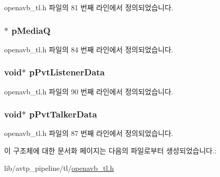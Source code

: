 openavb\+\_\+tl.\+h 파일의 81 번째 라인에서 정의되었습니다.

\subsubsection[{\texorpdfstring{p\+MediaQ}{pMediaQ}}]{$\ast$ p\+MediaQ}\hypertarget{structtl__state__t_a19b6a37a9e1222c5c08444ea175d6a45}{}\label{structtl__state__t_a19b6a37a9e1222c5c08444ea175d6a45}


openavb\+\_\+tl.\+h 파일의 84 번째 라인에서 정의되었습니다.

\subsubsection[{\texorpdfstring{p\+Pvt\+Listener\+Data}{pPvtListenerData}}]{\setlength{\rightskip}{0pt plus 5cm}void$\ast$ p\+Pvt\+Listener\+Data}\hypertarget{structtl__state__t_a37b77c3754bf67c9e13a356a2ea70ec6}{}\label{structtl__state__t_a37b77c3754bf67c9e13a356a2ea70ec6}


openavb\+\_\+tl.\+h 파일의 90 번째 라인에서 정의되었습니다.

\subsubsection[{\texorpdfstring{p\+Pvt\+Talker\+Data}{pPvtTalkerData}}]{\setlength{\rightskip}{0pt plus 5cm}void$\ast$ p\+Pvt\+Talker\+Data}\hypertarget{structtl__state__t_a18baa6360ea16357a2e906bc9bc4e61e}{}\label{structtl__state__t_a18baa6360ea16357a2e906bc9bc4e61e}


openavb\+\_\+tl.\+h 파일의 87 번째 라인에서 정의되었습니다.



이 구조체에 대한 문서화 페이지는 다음의 파일로부터 생성되었습니다.\+:\begin{DoxyCompactItemize}
\item 
lib/avtp\+\_\+pipeline/tl/\hyperlink{openavb__tl_8h}{openavb\+\_\+tl.\+h}\end{DoxyCompactItemize}
